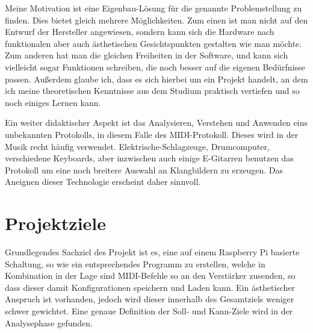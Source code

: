 Meine Motivation ist eine Eigenbau-Lösung für die genannte Problemstellung zu finden. Dies bietet gleich mehrere Möglichkeiten. Zum einen ist man nicht auf den Entwurf der Hersteller angewiesen, sondern kann sich die Hardware nach funktionalen aber auch ästhetischen Gesichtspunkten gestalten wie man möchte. Zum anderen hat man die gleichen Freiheiten in der Software, und kann sich vielleicht sogar Funktionen schreiben, die noch besser auf die eigenen Bedürfnisse passen. Außerdem glaube ich, dass es sich hierbei um ein Projekt handelt, an dem ich meine theoretischen Kenntnisse aus dem Studium praktisch vertiefen und so noch einiges Lernen kann.

Ein weiter didaktischer Aspekt ist das Analysieren, Verstehen und Anwenden eins unbekannten Protokolls, in diesem Falle des MIDI-Protokoll. Dieses wird in der Musik recht häufig verwendet. Elektrische-Schlagzeuge, Drumcomputer, verschiedene Keyboards, aber inzwischen auch einige E-Gitarren benutzen das Protokoll um eine noch breitere Auswahl an Klangbildern zu erzeugen. Das Aneignen dieser Technologie erscheint daher sinnvoll. 

\section{Projektziele}

	
	
	Grundlegendes Sachziel des Projekt ist es, eine auf einem Raspberry Pi basierte Schaltung, so wie ein entsprechendes Programm zu erstellen, welche in Kombination in der Lage sind MIDI-Befehle so an den Verstärker zusenden, so dass dieser damit Konfigurationen speichern und Laden kann. Ein ästhetischer Anspruch ist vorhanden, jedoch wird dieser innerhalb des Gesamtziels weniger schwer gewichtet. Eine genaue Definition der Soll- und Kann-Ziele wird in der Analysephase gefunden. 


 
	


